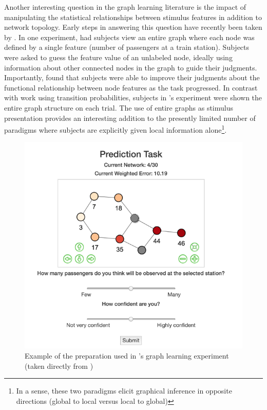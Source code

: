 \documentclass[12pt]{article}
\let\oldcite=\cite
\let\oldtextcite=\textcite
\renewcommand{\cite}[1]{\textcolor[rgb]{0, .121, .388}{\oldcite{#1}}}
\renewcommand{\textcite}[1]{\textcolor[rgb]{0, .121, .388}{\oldtextcite{#1}}}
\begin{document}
Another interesting question in the graph learning literature is the impact of manipulating the statistical relationships between stimulus features in addition to network topology. Early steps in answering this question have recently been taken by \textcite{wu2020inference}. In one experiment, \textcite{wu2020inference} had subjects view an entire graph where each node was defined by a single feature (number of passengers at a train station). Subjects were asked to guess the feature value of an unlabeled node, ideally using information about other connected nodes in the graph to guide their judgments. Importantly, \textcite{wu2020inference} found that subjects were able to improve their judgments about the functional relationship between node features as the task progressed. In contrast with work using transition probabilities, subjects in \textcite{wu2020inference}'s experiment were shown the entire graph structure on each trial. The use of entire graphs as stimulus presentation provides an interesting addition to the presently limited number of paradigms where subjects are explicitly given local information alone\footnote{In a sense, these two paradigms elicit graphical inference in opposite directions (global to local versus local to global)}.

\begin{figure}[h]
    \centering
    \label{fig:wu2020task}
    \includegraphics[scale=.4]{figures/wu2020task.png}
    \caption{Example of the preparation used in \textcite{wu2020inference}'s graph learning experiment (taken directly from \cite{wu2020inference})}
\end{figure}
\end{document}
